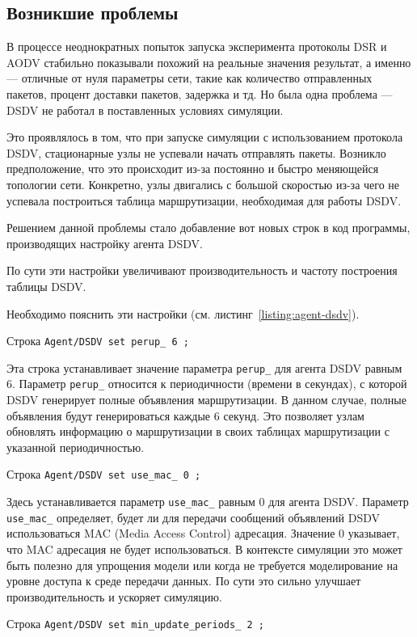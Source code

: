 \subsection{Возникшие проблемы}

В процессе неоднократных попыток запуска эксперимента протоколы DSR и AODV стабильно показывали похожий на реальные значения результат, а именно --- отличные от нуля параметры сети, такие как количество отправленных пакетов, процент доставки пакетов, задержка и тд. Но была одна проблема --- DSDV не работал в поставленных условиях симуляции. 

Это проявлялось в том, что при запуске симуляции с использованием протокола DSDV, стационарные узлы не успевали начать отправлять пакеты. Возникло предположение, что это происходит из-за постоянно и быстро меняющейся топологии сети. Конкретно, узлы двигались с большой скоростью из-за чего не успевала построиться таблица маршрутизации, необходимая для работы DSDV.

Решением данной проблемы стало добавление вот новых строк в код программы, производящих настройку агента DSDV. 

По сути эти настройки увеличивают производительность и частоту построения таблицы DSDV.

Необходимо пояснить эти настройки (см. листинг~\ref{listing:agent-dsdv}).

Строка \verb|Agent/DSDV set perup_ 6 ;|

Эта строка устанавливает значение параметра \verb|perup_| для агента DSDV равным 6. Параметр \verb|perup_| относится к периодичности (времени в секундах), с которой DSDV генерирует полные объявления маршрутизации. В данном случае, полные объявления будут генерироваться каждые 6 секунд. Это позволяет узлам обновлять информацию о маршрутизации в своих таблицах маршрутизации с указанной периодичностью.

Строка \verb|Agent/DSDV set use_mac_ 0 ;|

Здесь устанавливается параметр \verb|use_mac_| равным 0 для агента DSDV. Параметр \verb|use_mac_| определяет, будет ли для передачи сообщений объявлений DSDV использоваться MAC (Media Access Control) адресация. Значение 0 указывает, что MAC адресация не будет использоваться. В контексте симуляции это может быть полезно для упрощения модели или когда не требуется моделирование на уровне доступа к среде передачи данных. По сути это сильно улучшает производительность и ускоряет симуляцию.

Строка \verb|Agent/DSDV set min_update_periods_ 2 ;|

